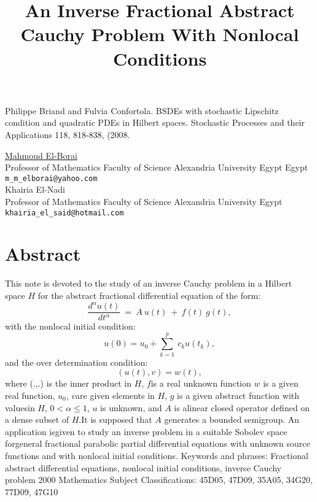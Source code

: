 \documentclass[article,A4,11pt]{llncs}%
\begin{document}

\begin{thebibliography}{10}
{\sc Philippe Briand and Fulvia Confortola}. {BSDEs with stochastic Lipschitz condition and quadratic PDEs in Hilbert spaces}. Stochastic Processes and their Applications 118, 818-838, (2008.
\end{thebibliography}

\title{An Inverse Fractional Abstract Cauchy Problem With Nonlocal Conditions}
 \author{} \institute{}
\maketitle
\begin{center}
{\large \underline{Mahmoud El-Borai}}\\
Professor of Mathematics Faculty of Science Alexandria University Egypt Egypt\\
{\tt \tt m\_m\_elborai@yahoo.com}
\\ \vspace{4mm}
{\large Khairia El-Nadi}\\
Professor of Mathematics Faculty of Science Alexandria University  Egypt\\
{\tt \tt khairia\_el\_said@hotmail.com}
\end{center}

\section*{Abstract}



This note is devoted to the study of an inverse Cauchy problem in a Hilbert space $H$ for the abstract fractional differential equation of the form:  $$\frac{d^{\alpha}u(t)}{dt^\alpha}~=~A~u(t)~+~f(t)~g(t),$$with the nonlocal initial condition:$$u(0) = u_0 + \sum_{k=1}^p~c_k u(t_k),$$and the over determination condition:$$(u(t), v) = w (t),$$where (.,.) is the inner product in $H$, $f$is a real unknown function $w$ is a given real function, $u_0$, $v$are given elements in $H$, $g$ is a given abstract function with valuesin $H$, $0 < \alpha \leq 1 $, $u$ is unknown, and $A$ is alinear closed operator defined on a dense subset of $H$.It is supposed that $A$ generates a bounded semigroup. An application isgiven to study an inverse problem in a suitable Sobolev space forgeneral fractional parabolic partial differential equations with  unknown source functions and with nonlocal initial conditions.
Keywords and phrases: Fractional abstract differential equations, nonlocal initial conditions, inverse Cauchy problem 
2000 Mathematics Subject Classifications: 45D05, 47D09, 35A05, 34G20, 77D09, 47G10
\end{document}
